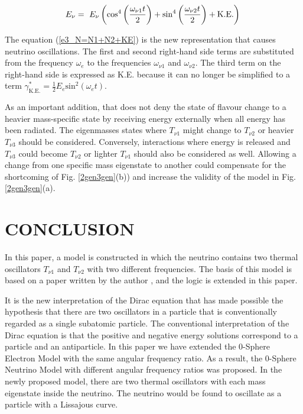\documentclass[%
 reprint,
 amsmath,amssymb,
 aps,
]{revtex4-1}
\numberwithin{equation}{section}%
\begin{document}
    \begin{equation}
        E_{\nu} = \ E_{\nu} \left( \mathrm{cos}^{4} \left( \frac{\omega_{\nu 1} t}{2} \right) + \mathrm{sin}^{4} \left( \frac{\omega_{\nu 2} t}{2} \right) + \mathrm{K.E.} \right) \\
        \label{e3_N=N1+N2+KE}
    \end{equation}


The equation (\ref{e3_N=N1+N2+KE}) is the new representation that causes neutrino oscillations. The first and second right-hand side terms are substituted from the frequency $\omega_e$ to the frequencies $\omega_{\nu 1}$ and $\omega_{\nu 2}$. The third term on the right-hand side is expressed as K.E. because it can no longer be simplified to a term $\gamma^{*}_{\mathrm{K.E.}} = \frac{1}{2} E_{e} \mathrm{sin}^{2} (\omega_e t)$.


As an important addition, that does not deny the state of flavour change to a heavier mass-specific state by receiving energy externally when all energy has been radiated. The eigenmasses states where $T_{\nu \mathrm{1}}$ might change to $T_{\nu \mathrm{2}}$ or heavier $T_{\nu \mathrm{3}}$ should be considered. Conversely, interactions where energy is released and $T_{\nu \mathrm{3}}$ could become $T_{\nu \mathrm{2}}$ or lighter $T_{\nu \mathrm{1}}$ should also be considered as well. Allowing a change from one specific mass eigenstate to another could compensate for the shortcoming of Fig. \ref{2gen3gen}(b)) and increase the validity of the model in Fig. \ref{2gen3gen}(a).


\section{\label{sec:CONCLUSION}CONCLUSION}


In this paper, a model is constructed in which the neutrino contains two thermal oscillators $T_{\nu \mathrm{1}}$ and $T_{\nu \mathrm{2}}$ with two different frequencies. The basis of this model is based on a paper written by the author \cite{Hanamura1}, and the logic is extended in this paper.


It is the new interpretation of the Dirac equation that has made possible the hypothesis that there are two oscillators in a particle that is conventionally regarded as a single subatomic particle. The conventional interpretation of the Dirac equation is that the positive and negative energy solutions correspond to a particle and an antiparticle. In this paper we have extended the 0-Sphere Electron Model with the same angular frequency ratio. As a result, the 0-Sphere Neutrino Model with different angular frequency ratios was proposed. In the newly proposed model, there are two thermal oscillators with each mass eigenstate inside the neutrino. The neutrino would be found to oscillate as a particle with a Lissajous curve.
\end{document}

